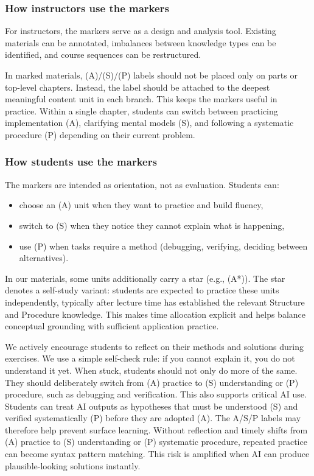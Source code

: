 \documentclass{article}
\begin{document}
\subsubsection{How instructors use the markers}
For instructors, the markers serve as a design and analysis tool. Existing materials can be annotated, imbalances between knowledge types can be identified, and course sequences can be restructured.\par

In marked materials, (A)/(S)/(P) labels should not be placed only on parts or top-level chapters. Instead, the label should be attached to the deepest meaningful content unit in each branch. This keeps the markers useful in practice. Within a single chapter, students can switch between practicing implementation (A), clarifying mental models (S), and following a systematic procedure (P) depending on their current problem.\par

\subsubsection{How students use the markers}

The markers are intended as orientation, not as evaluation. Students can:\vspace{-2mm}
\begin{itemize}[leftmargin=*]
  \item choose an (A) unit when they want to practice and build fluency,\vspace{-1mm}
  \item switch to (S) when they notice they cannot explain what is happening,\vspace{-1mm}
  \item use (P) when tasks require a method (debugging, verifying, deciding between alternatives).
\end{itemize}

In our materials, some units additionally carry a star (e.g., (A*)). The star denotes a self-study variant: students are expected to practice these units independently, typically after lecture time has established the relevant Structure and Procedure knowledge. This makes time allocation explicit and helps balance conceptual grounding with sufficient application practice.

We actively encourage students to reflect on their methods and solutions during exercises. We use a simple self-check rule: if you cannot explain it, you do not understand it yet. When stuck, students should not only do more of the same. They should deliberately switch from (A) practice to (S) understanding or (P) procedure, such as debugging and verification. This also supports critical AI use. Students can treat AI outputs as hypotheses that must be understood (S) and verified systematically (P) before they are adopted (A).
The A/S/P labels may therefore help prevent surface learning. Without reflection and timely shifts from (A) practice to (S) understanding or (P) systematic procedure, repeated practice can become syntax pattern matching. This risk is amplified when AI can produce plausible-looking solutions instantly.
\end{document}
